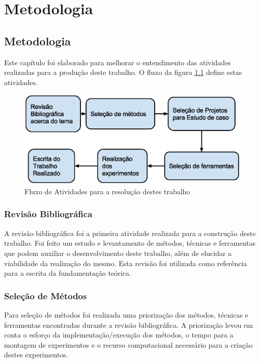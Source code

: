 \part{Metodologia}

\chapter[Metodologia]{Metodologia}


Este capítulo foi elaborado para melhorar o entendimento das atividades
 realizadas para a produção deste trabalho. O fluxo da figura 
\ref{fig:fases_metodologia} define estas atividades.


\begin{figure}[h]
    \centering
    \label{fig:fases_metodologia}
        \includegraphics[keepaspectratio=true,scale=0.7]{figuras/fases_metodologia.eps}
    \caption{Fluxo de Atividades para a resolução destes trabalho}
\end{figure}


\section{Revisão Bibliográfica}

A revisão bibliográfica foi a primeira atividade realizada para a construção
 deste trabalho. Foi feito um estudo e levantamento de métodos, técnicas e
 ferramentas que podem auxiliar o desenvolvimento deste trabalho, além de
 elucidar a viabilidade da realização do mesmo. Esta revisão foi utilizada
 como referência para a  escrita da fundamentação teórica.

\section{Seleção de Métodos}

Para seleção de métodos foi realizada uma priorização dos métodos, técnicas e
 ferramentas encontradas durante a revisão bibliográfica. A priorização levou
 em conta o esforço da implementação/execução dos métodos, o tempo para a
 montagem de experimentos e o recurso computacional necessário para a criação
 destes experimentos.


